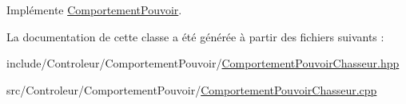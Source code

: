 Implémente \hyperlink{class_comportement_pouvoir_a8b8f4e753291ab73ab0016106f3948ff}{Comportement\-Pouvoir}.



La documentation de cette classe a été générée à partir des fichiers suivants \-:\begin{DoxyCompactItemize}
\item 
include/\-Controleur/\-Comportement\-Pouvoir/\hyperlink{_comportement_pouvoir_chasseur_8hpp}{Comportement\-Pouvoir\-Chasseur.\-hpp}\item 
src/\-Controleur/\-Comportement\-Pouvoir/\hyperlink{_comportement_pouvoir_chasseur_8cpp}{Comportement\-Pouvoir\-Chasseur.\-cpp}\end{DoxyCompactItemize}
